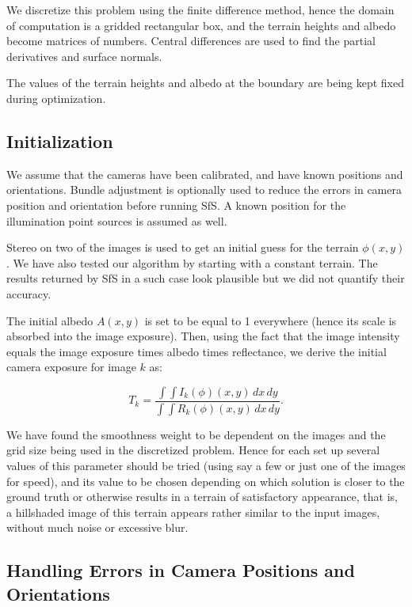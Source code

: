 \documentclass[12pt,oneside]{article}
\begin{document}
We discretize this problem using the finite difference method, hence the
domain of computation is a gridded rectangular box, and the terrain heights and
albedo become matrices of numbers. Central differences are used to find
the partial derivatives and surface normals.

The values of the terrain heights and albedo at the boundary are being
kept fixed during optimization.

\subsection{Initialization}

We assume that the cameras have been calibrated, and have known
positions and orientations. Bundle adjustment is optionally used to
reduce the errors in camera position and orientation before running
SfS. A known position for the illumination point sources is assumed as
well.

Stereo on two of the images is used to get an initial guess for the
terrain $\phi(x, y)$.  We have also tested our algorithm by starting
with a constant terrain. The results returned by SfS in a such case look
plausible but we did not quantify their accuracy.

The initial albedo $A(x, y)$ is set to be equal to 1 everywhere (hence
its scale is absorbed into the image exposure). Then, using the fact that
the image intensity equals the image exposure times albedo times
reflectance, we derive the initial camera exposure for image $k$ as:

$$
T_k = \frac{ \int\!\! \int \! I_k(\phi)(x, y) \,dx\,dy }{ \int\!\! \int \! R_k(\phi)(x, y) \,dx\,dy}.
$$

We have found the smoothness weight to be dependent on the images and
the grid size being used in the discretized problem. Hence for each set
up several values of this parameter should be tried (using say a few or
just one of the images for speed), and its value to be chosen depending
on which solution is closer to the ground truth or otherwise results in
a terrain of satisfactory appearance, that is, a hillshaded image of this
terrain appears rather similar to the input images, without much noise or
excessive blur.

\subsection{Handling Errors in Camera Positions and Orientations}
\label{multires}
\end{document}
